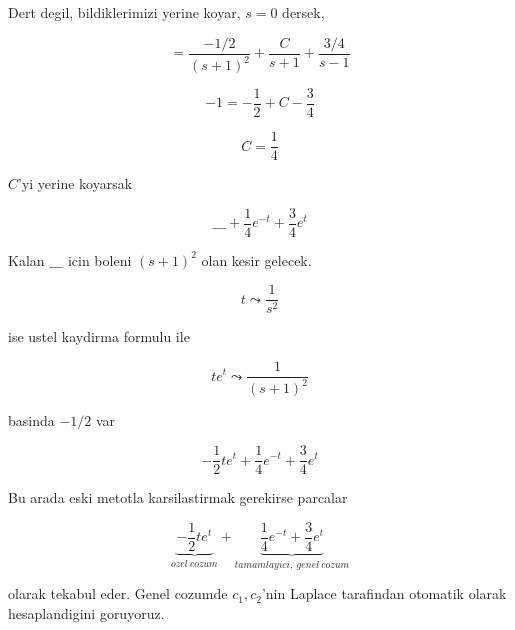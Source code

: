 \documentclass[12pt,fleqn]{article}\usepackage{../common}
\begin{document}
Dert degil, bildiklerimizi yerine koyar, $s=0$ dersek, 

\[ = \frac{-1/2}{(s+1)^2} + \frac{C}{s+1} + \frac{3/4}{s-1} \]

\[ -1 = -\frac{1}{2} + C - \frac{3}{4}\]

\[ C = \frac{1}{4} \]

$C$'yi yerine koyarsak

\[ \_\_\_ + \frac{1}{4}e^{-t}  + \frac{3}{4}e^t  \]

Kalan $\_\_\_$ icin boleni $(s+1)^2$ olan kesir gelecek. 

\[ t \leadsto \frac{1}{s^2} \]

ise ustel kaydirma formulu ile 

\[ te^{t} \leadsto \frac{1}{(s+1)^2} \]

basinda $-1/2$ var

\[ -\frac{1}{2}te^t + \frac{1}{4}e^{-t}  + \frac{3}{4}e^t  \]

Bu arada eski metotla karsilastirmak gerekirse parcalar

\[ \underbrace{-\frac{1}{2}te^t}_{ozel \ cozum} + 
\underbrace{\frac{1}{4}e^{-t}  + \frac{3}{4}e^t}_{tamamlayici, \ genel \ cozum}
\]

olarak tekabul eder. Genel cozumde $c_1,c_2$'nin Laplace tarafindan
otomatik olarak hesaplandigini goruyoruz. 
\end{document}
